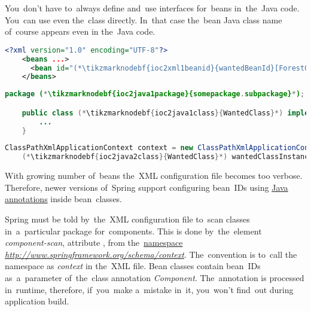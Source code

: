 \note You~don't have to~always define and~use interfaces for~beans in~the~Java code. You~can use even the~class directly. In~that case the~bean Java class name of~course appears even in the~Java code.
\newpage

\begin{lstlisting}[language=XML, title={Configuration XML}]
    <?xml version="1.0" encoding="UTF-8"?>
    <beans ...>
      <bean id="(*\tikzmarknodebf{ioc2xml1beanid}{wantedBeanId}[ForestGreen]*)" class="(*\tikzmarknodebf{ioc2xml1package}{somepackage.subpackage}[ForestGreen]*).(*\tikzmarknodebf{ioc2xml1class}{WantedClass}[ForestGreen]*)"/>
    </beans>
\end{lstlisting}
\begin{lstlisting}[language=Java, title={Wanted class}]
    package (*\tikzmarknodebf{ioc2java1package}{somepackage.subpackage}*);

    public class (*\tikzmarknodebf{ioc2java1class}{WantedClass}*) implements WantedClassInterface {
        ...
    }
\end{lstlisting}
\begin{lstlisting}[language=Java, title={Usage}]
    ClassPathXmlApplicationContext context = new ClassPathXmlApplicationContext("configurationFile.xml");
    (*\tikzmarknodebf{ioc2java2class}{WantedClass}*) wantedClassInstance = context.getBean("(*\tikzmarknodebf{ioc2java2beanid}{wantedBeanId}[ForestGreen]*)", (*\tikzmarknodebf{ioc2java2class2}{WantedClass}*).class);
\end{lstlisting}

\label{iocannotations}
With growing number of~beans the~XML configuration file becomes too verbose. Therefore, newer versions of~Spring support configuring bean~IDs using \hyperref[javaannotation]{Java annotations} inside bean~classes.

Spring must be told by~the~XML configuration file to~scan classes in~a~particular package for~components. This is done by~the~element \textit{component-scan}, attribute , from the~\hyperref[namespaces]{namespace} \textit{\href{http://www.springframework.org/schema/context}{http://www.springframework.org/schema/context}}. The~convention is to~call the namespace as \textit{context} in the~XML file. Bean classes contain bean~IDs as~a~parameter of~the~class annotation \textit{Component}. The~annotation is processed in~runtime, therefore, if~you~make a~mistake in~it, you~won't find~out during application build.
\newpage


